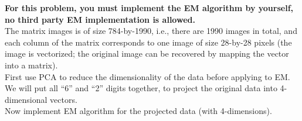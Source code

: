 \documentclass[12pt]{article}
\begin{document}
\textbf{For this problem, you must implement the EM algorithm by yourself, no third party EM implementation is allowed.} \\

The matrix \textsf{images} is of size 784-by-1990, i.e., there are 1990 images in total, and each column of the matrix corresponds to one image of size 28-by-28 pixels (the image is vectorized; the original image can be recovered by mapping the vector into a matrix).  \\

First use PCA to reduce the dimensionality of the data before applying to EM. We will put all ``6'' and ``2'' digits together, to project the original data into 4-dimensional vectors. \\

Now implement EM algorithm for the projected data (with 4-dimensions). 
\end{document}
